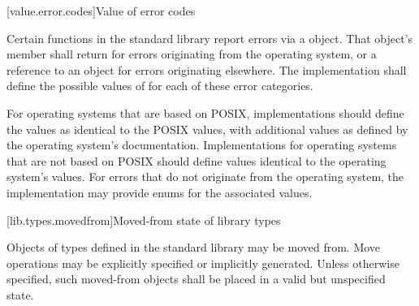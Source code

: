 [value.error.codes]{Value of error codes}

\pnum
Certain functions in the \Cpp{} standard library report errors via a
 object. That object's
 member shall return  for
errors originating from the operating system, or a reference to an
  object for errors originating elsewhere.
The implementation shall define the possible values of  for each of these
error categories.
\begin{example}
For operating systems that are based on POSIX,
implementations should define the  values as
identical to the POSIX  values, with additional values as defined by the
operating system's documentation. Implementations for operating systems that are not
based on POSIX should define values identical to the operating system's
values. For errors that do not originate from the operating system, the implementation
may provide enums for the associated values.
\end{example}

[lib.types.movedfrom]{Moved-from state of library types}

\pnum
Objects of types defined in the \Cpp{} standard library may be moved
from. Move operations may be explicitly specified or
implicitly generated. Unless otherwise specified, such moved-from objects shall
be placed in a valid but unspecified state.
